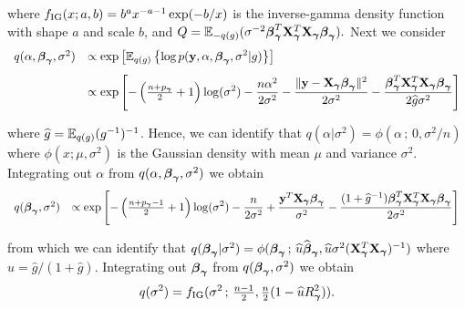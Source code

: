 \noindent where $f_{\mbox{\scriptsize IG}}( x ; a, b) = b^a x^{-a-1}\exp(-b/x)$
is the inverse-gamma density function with shape $a$ and scale $b$, and 
$Q = {\mathbb E}_{-q(g)}( \sigma^{-2} {\boldsymbol \beta}_{\boldsymbol \gamma}^T{\bf X}_{\boldsymbol \gamma}^T{\bf X}_{\boldsymbol \gamma}{\boldsymbol \beta}_{\boldsymbol \gamma} ).$
Next we consider
$$
\begin{array}{rl}
q(\alpha,{\boldsymbol \beta}_{\boldsymbol \gamma},\sigma^2)
& \displaystyle \propto \exp\left[
{\mathbb E}_{q(g)}\left\{
\log p({\bf y},\alpha,{\boldsymbol \beta}_{\boldsymbol \gamma},\sigma^2|g)
\right\}
\right]
\\ [2ex]
& \displaystyle \propto \exp\left[
- \left( \tfrac{n+p_{\boldsymbol \gamma}}{2} + 1\right)\log(\sigma^2) 
- \frac{n\alpha^2}{2\sigma^2} 
- \frac{\|{\bf y} - {\bf X}_{\boldsymbol \gamma}{\boldsymbol \beta}_{\boldsymbol \gamma}\|^2}{2\sigma^2}
- \frac{{\boldsymbol \beta}_{\boldsymbol \gamma}^T{\bf X}_{\boldsymbol \gamma}^T{\bf X}_{\boldsymbol \gamma}{\boldsymbol \beta}_{\boldsymbol \gamma}}{2 \widehat{g}\sigma^2}
\right]
\end{array} 
$$

\noindent where $\widehat{g} = {\mathbb E}_{q(g)}(g^{-1})^{-1}$. Hence, we can identify that
$q(\alpha|\sigma^2) = \phi(\alpha \, ; \, 0,\sigma^2/n)$
where $\phi(x;\mu,\sigma^2)$ is the Gaussian density with mean $\mu$
and variance $\sigma^2$.
Integrating out $\alpha$ from $q(\alpha,{\boldsymbol \beta}_{\boldsymbol \gamma},\sigma^2)$ we obtain
$$
\begin{array}{rl}
q({\boldsymbol \beta}_{\boldsymbol \gamma},\sigma^2)
& \displaystyle \propto 
\exp\left[
- \left( \tfrac{n+p_{\boldsymbol \gamma}-1}{2} + 1\right)\log(\sigma^2) 
- \frac{n}{2\sigma^2}
+ \frac{{\bf y}^T{\bf X}_{\boldsymbol \gamma}{\boldsymbol \beta}_{\boldsymbol \gamma}}{\sigma^2}
- \frac{(1 + \widehat{g}^{-1}){\boldsymbol \beta}_{\boldsymbol \gamma}^T{\bf X}_{\boldsymbol \gamma}^T{\bf X}_{\boldsymbol \gamma}{\boldsymbol \beta}_{\boldsymbol \gamma}}{2\sigma^2}
\right]
\end{array} 
$$

\noindent from which we can identify that
$q({\boldsymbol \beta}_{\boldsymbol \gamma}|\sigma^2) = \phi( {\boldsymbol \beta}_{\boldsymbol \gamma} \, ; \, \widehat{u} \widehat{{\boldsymbol \beta}}_{\boldsymbol \gamma},  \widehat{u} \sigma^2 ({\bf X}_{\boldsymbol \gamma}^T{\bf X}_{\boldsymbol \gamma})^{-1})$
where $\widehat{u} = \widehat{g}/(1 + \widehat{g})$.
Integrating out ${\boldsymbol \beta}_{\boldsymbol \gamma}$ from $q({\boldsymbol \beta}_{\boldsymbol \gamma},\sigma^2)$
we obtain
$$
q(\sigma^2) = f_{\mbox{\scriptsize IG}}(\sigma^2 \, ; \, 
\tfrac{n-1}{2},
\tfrac{n}{2}( 1 - \widehat{u} R_{\boldsymbol \gamma}^2)).
$$

